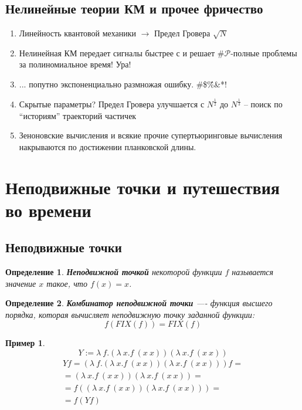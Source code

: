 \documentclass[a0,portrait]{a0poster}
\newtheorem{defin}{Определение}[section]
\newtheorem{example}{Пример}[section]
\begin{document}
\begin{multicols}{2}
\subsection{Нелинейные теории КМ и прочее фричество}
\begin{enumerate}
 \item Линейность квантовой механики $\rightarrow$ Предел Гровера $\sqrt{N}$
\item Нелинейная КМ передает сигналы быстрее с и  решает $\mathcal{\#P}$-полные проблемы за полиномиальное время! Ура!
\item ... попутно экспоненциально размножая ошибку. \#\$\^\%\&*!
\item Скрытые параметры? Предел Гровера улучшается с $N^\frac{1}{2}$ до $N^\frac{1}{3}$ -- поиск по ``историям'' траекторий частичек
\item Зеноновские вычисления и всякие прочие супертьюринговые вычисления  накрываются по достижении планковской длины.  
\end{enumerate}

\section{Неподвижные точки и путешествия во времени}
\subsection{Неподвижные точки}
\begin{defin}
 \textbf{Неподвижной точкой} некоторой функции $f$ называется значение $x$ такое, что $f(x) = x$.
\end{defin}

\begin{defin}
 \textbf{Комбинатор неподвижной точки} —- функция высшего порядка, которая вычисляет неподвижную точку заданной функции:
\[
 f (FIX(f))  = FIX (f)
\]
\end{defin}

\begin{example}
  \[
 Y := \lambda\ f. (\lambda\ x . f\  (x \  x)) (\lambda\ x . f\  (x \  x))
\]
\begin{align*}
 Y f = (\lambda\ f.(\lambda\ x.f\  (x\  x)) (\lambda\ x.f\  (x\  x))) f = \\
 = (\lambda\ x.f\  (x\  x)) (\lambda\ x.f\  (x\  x)) =  \\
=  f((\lambda\ x.f\  (x\  x)) (\lambda\ x.f\  (x\  x))) = \\
 =  f(Y f) 
\end{align*}
\end{example}


\end{multicols}
\end{document}
